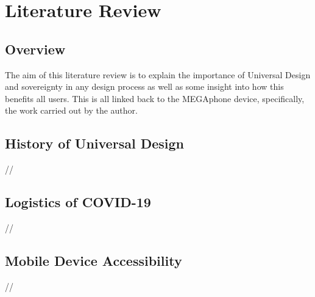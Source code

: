 
\chapter{Literature Review} %

\label{Chapter2} %


\section{Overview}  
The aim of this literature review is to explain the importance of Universal Design and sovereignty in any design process as well as some insight into how this benefits all users. 
This is all linked back to the MEGAphone device, specifically, the work carried out by the author.


\section{History of Universal Design}
//


\section{Logistics of COVID-19}
//


\section{Mobile Device Accessibility}
//

